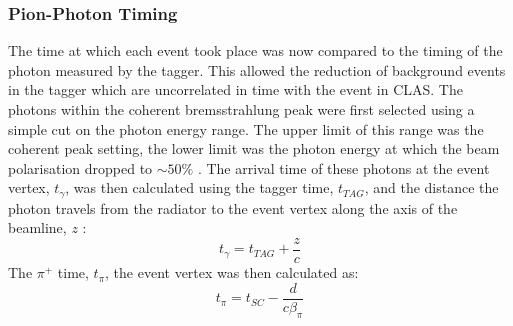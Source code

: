 \subsubsection{Pion-Photon Timing}
The time at which each event took place was now compared to the timing of the photon measured by the tagger. This allowed the reduction of background events in the tagger which are uncorrelated in time with the event in CLAS. The photons within the coherent bremsstrahlung peak were first selected using a simple cut on the photon energy range. The upper limit of this range was the coherent peak setting, the lower limit was the photon energy at which the beam polarisation dropped to $\sim50\%$ . The arrival time of these photons at the event vertex, $ t_\gamma$, was then calculated using the tagger time, $t_{TAG}$, and the distance the photon travels from the radiator to the event vertex along the axis of the beamline, $z$ :
\begin{equation} \label{eqn:t_tag}
  t_\gamma = t_{TAG} + \frac{z}{c}
\end{equation}
The $\pi^+$ time, $t_\pi$, the event vertex was then calculated as:
\begin{equation} \label{eqn:t_sc}
  t_\pi = t_{SC} - \frac{d}{c \beta_\pi}
\end{equation}
